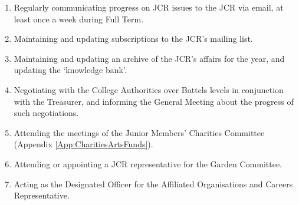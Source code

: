 \begin{enumerate}
	\item Regularly communicating progress on JCR issues to the JCR via email, at least once a week during Full Term.
	\item Maintaining and updating subscriptions to the JCR's mailing list.
	\item Maintaining and updating an archive of the JCR's affairs for the year, and updating the `knowledge bank'.
	\item Negotiating with the College Authorities over Battels levels in conjunction with the Treasurer, and informing the General Meeting about the progress of such negotiations.
	\item Attending the meetings of the Junior Members' Charities Committee (Appendix \ref{App:CharitiesArtsFunds}).
	\item Attending or appointing a JCR representative for the Garden Committee.
	\item Acting as the Designated Officer for the Affiliated Organisations and Careers Representative.
\end{enumerate}
